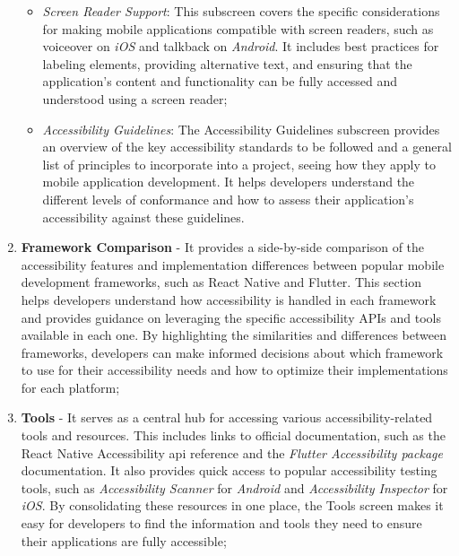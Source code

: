 \begin{enumerate}
\begin{itemize}
        \item \textit{Screen Reader Support}: This subscreen covers the specific considerations for making mobile applications compatible with screen readers, such as \gls{voiceover} on \textit{iOS} and \gls{talkback} on \textit{Android}. It includes best practices for labeling elements, providing alternative text, and ensuring that the application's content and functionality can be fully accessed and understood using a screen reader;

        \item \textit{Accessibility Guidelines}: The Accessibility Guidelines subscreen provides an overview of the key accessibility standards to be followed and a general list of principles to incorporate into a project, seeing how they apply to mobile application development. It helps developers understand the different levels of conformance and how to assess their application's accessibility against these guidelines.
    \end{itemize}

\item \textbf{Framework Comparison} - It provides a side-by-side comparison of the accessibility features and implementation differences between popular mobile development frameworks, such as React Native and Flutter. This section helps developers understand how accessibility is handled in each framework and provides guidance on leveraging the specific accessibility APIs and tools available in each one. By highlighting the similarities and differences between frameworks, developers can make informed decisions about which framework to use for their accessibility needs and how to optimize their implementations for each platform;

\item \textbf{Tools} - It serves as a central hub for accessing various accessibility-related tools and resources. This includes links to official documentation, such as the React Native Accessibility \acrshort{api} reference and the \textit{Flutter Accessibility package} documentation. It also provides quick access to popular accessibility testing tools, such as \textit{Accessibility Scanner} for \textit{Android} and \textit{Accessibility Inspector} for \textit{iOS}. By consolidating these resources in one place, the Tools screen makes it easy for developers to find the information and tools they need to ensure their applications are fully accessible; 


\end{enumerate}
